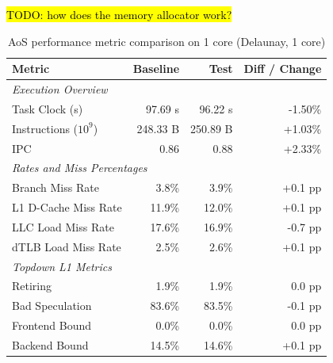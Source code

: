 \documentclass[leqno,11pt]{article}
\begin{document}
\hl{TODO: how does the memory allocator work?}

    \begin{table}[htbp]
      \centering
      \caption{AoS performance metric comparison on 1 core (Delaunay, 1 core)}
      \label{tab:perf_comparison_aos_delaunay_1core}
      \begin{tabular}{lrrr}
        \toprule
        \textbf{Metric} & \textbf{Baseline} & \textbf{Test} & \textbf{Diff / Change} \\
        \midrule
        \multicolumn{4}{l}{\textit{Execution Overview}} \\
        \quad Task Clock (s)           & 97.69 s   & 96.22 s   & -1.50\%   \\
        \quad Instructions ($10^9$)    & 248.33 B  & 250.89 B  & +1.03\%   \\
        \quad IPC                      & 0.86       & 0.88       & +2.33\%    \\
        \midrule
        \multicolumn{4}{l}{\textit{Rates and Miss Percentages}} \\
        \quad Branch Miss Rate         & 3.8\%      & 3.9\%      & +0.1 pp     \\
        \quad L1 D-Cache Miss Rate     & 11.9\%      & 12.0\%      & +0.1 pp    \\
        \quad LLC Load Miss Rate       & 17.6\%     & 16.9\%     & -0.7 pp    \\
        \quad dTLB Load Miss Rate      & 2.5\%      & 2.6\%      & +0.1 pp     \\
        \midrule
        \multicolumn{4}{l}{\textit{Topdown L1 Metrics}} \\
        \quad Retiring                 & 1.9\%      & 1.9\%      & 0.0 pp    \\
        \quad Bad Speculation          & 83.6\%     & 83.5\%     & -0.1 pp   \\
        \quad Frontend Bound           & 0.0\%      & 0.0\%      & 0.0 pp    \\
        \quad Backend Bound            & 14.5\%      & 14.6\%      & +0.1 pp    \\
        \bottomrule
      \end{tabular}
    \end{table}
\end{document}
